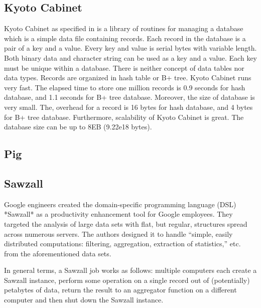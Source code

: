 \subsection{Kyoto Cabinet}

     Kyoto Cabinet as specified in \cite{www-KyotoCabinet} is a
     library of routines for managing a database which is a simple
     data file containing records. Each record in the database is a
     pair of a key and a value. Every key and value is serial bytes
     with variable length. Both binary data and character string can
     be used as a key and a value. Each key must be unique within a
     database.  There is neither concept of data tables nor data
     types. Records are organized in hash table or B+ tree. Kyoto
     Cabinet runs very fast. The elapsed time to store one million
     records is 0.9 seconds for hash database, and 1.1 seconds for B+
     tree database. Moreover, the size of database is very small. The,
     overhead for a record is 16 bytes for hash database, and 4 bytes
     for B+ tree database. Furthermore, scalability of Kyoto Cabinet
     is great. The database size can be up to 8EB (9.22e18 bytes).

\subsection{Pig}
\subsection{Sawzall}

     Google engineers created the domain-specific programming language
     (DSL) *Sawzall* as a productivity enhancement tool for Google
     employees.  They targeted the analysis of large data sets with
     flat, but regular, structures spread across numerous servers.
     The authors designed it to handle ``simple, easily distributed
     computations: filtering, aggregation, extraction of statistics,''
     etc. from the aforementioned data sets.
     \cite{pike05sawzall}

     In general terms, a Sawzall job works as follows: multiple
     computers each create a Sawzall instance, perform some operation
     on a single record out of (potentially) petabytes of data, return
     the result to an aggregator function on a different computer and
     then shut down the Sawzall instance.


